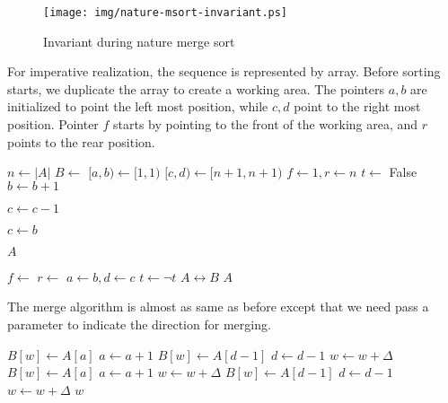 \documentclass[UTF8]{article}
\begin{document}
\begin{figure}[htbp]
 \centering
 \texttt{[image: img/nature-msort-invariant.ps]}
 \caption{Invariant during nature merge sort}
 \label{fig:nature-msort-invariant}
\end{figure}

For imperative realization, the sequence is represented by array. Before sorting starts,
we duplicate the array to create a working area. The pointers $a, b$ are initialized to
point the left most position, while $c, d$ point to the right most position. Pointer $f$
starts by pointing to the front of the working area, and $r$ points to the rear
position.

\begin{algorithmic}[1]
    \State $n \gets |A|$
    \State $B \gets$   
    \Loop
      \State $[a, b) \gets [1, 1)$
      \State $[c, d) \gets [n+1, n+1)$
      \State $f \gets 1, r \gets n$ 
      \State $t \gets $ False 
       
        \Repeat \Comment{Span $[a, b)$}
          \State $b \gets b + 1$

        \Repeat \Comment{Span $[c, d)$}
          \State $c \gets c - 1$

         
          \State $c \gets b$
        \EndIf

         \Comment{Done if $[a, b)$ spans to the whole array}
          \State \Return $A$
        \EndIf

         
          \State $f \gets$ \Call{Merge}{$A, [a, b), [c, d), B, f, 1$}
        \Else {}
          \State $r \gets$ \Call{Merge}{$A, [a, b), [c, d), B, r, -1$}
        \EndIf
        \State $a \gets b, d \gets c$
        \State $t \gets \lnot t$ 
      \EndWhile
      \State {} $A \leftrightarrow B$ 
    \EndLoop
  \EndIf
  \State \Return $A$
\EndFunction
\end{algorithmic}

The merge algorithm is almost as same as before except that we need pass a parameter
to indicate the direction for merging.

\begin{algorithmic}[1]
\Function{Merge}{$A, [a, b), [c, d), B, w, \Delta$}
      \State $B[w] \gets A[a]$
      \State $a \gets a + 1$
    \Else
      \State $B[w] \gets A[d-1]$
      \State $d \gets d - 1$
    \EndIf
    \State $w \gets w + \Delta$
  \EndWhile
    \State $B[w] \gets A[a]$
    \State $a \gets a + 1$
    \State $w \gets w + \Delta$
  \EndWhile
    \State $B[w] \gets A[d-1]$
    \State $d \gets d - 1$
    \State $w \gets w + \Delta$
  \EndWhile
  \State \Return $w$
\EndFunction
\end{algorithmic}
\end{document}
